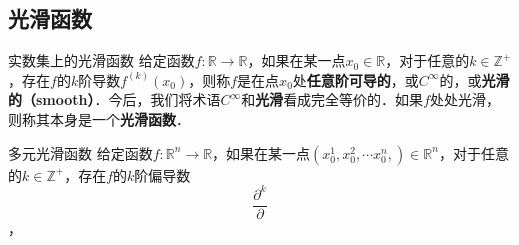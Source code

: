 
\subsection{光滑函数}

\begin{definition}{实数集上的光滑函数}
给定函数$f:\mathbb{R}\rightarrow\mathbb{R}$，如果在某一点$x_0\in\mathbb{R}$，对于任意的$k\in\mathbb{Z}^+$，存在$f$的$k$阶导数$f^{(k)}(x_0)$，则称$f$是在点$x_0$处\textbf{任意阶可导的}，或$C^\infty$的，或\textbf{光滑的（smooth）}．今后，我们将术语$C^{\infty}$和\textbf{光滑}看成完全等价的．如果$f$处处光滑，则称其本身是一个\textbf{光滑函数}．
\end{definition}

\begin{definition}{多元光滑函数}
给定函数$f:\mathbb{R}^n\rightarrow\mathbb{R}$，如果在某一点$(x_0^1, x_0^2, \cdots x_0^n,) \in\mathbb{R}^n$，对于任意的$k\in\mathbb{Z}^+$，存在$f$的$k$阶偏导数$$\frac{\partial^k}{\partial}$$，
\end{definition}



